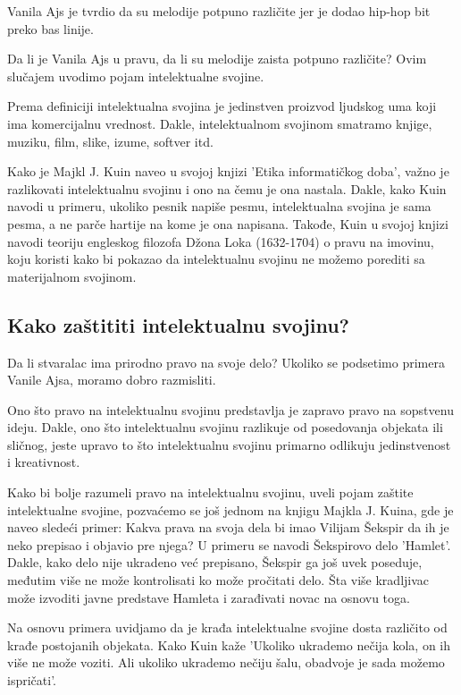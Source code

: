 \documentclass[a4paper]{article}
\begin{document}
Vanila Ajs je tvrdio da su melodije potpuno različite jer je dodao hip-hop bit preko bas linije. \cite{rollingstone}

Da li je Vanila Ajs u pravu, da li su melodije zaista potpuno različite? Ovim slučajem uvodimo pojam intelektualne svojine.

Prema definiciji intelektualna svojina je jedinstven proizvod ljudskog uma koji ima komercijalnu vrednost. \cite{texasUniv}
Dakle, intelektualnom svojinom smatramo knjige, muziku, film, slike, izume, softver itd.

Kako je Majkl J. Kuin naveo u svojoj knjizi 'Etika informatičkog doba', \cite{ethics} važno je razlikovati 
intelektualnu svojinu i ono na čemu je ona nastala. Dakle, kako Kuin navodi u primeru, ukoliko pesnik
napiše pesmu, intelektualna svojina je sama pesma, a ne parče hartije na kome je ona napisana.
Takođe, Kuin u svojoj knjizi navodi teoriju engleskog filozofa Džona Loka (1632-1704) o pravu na imovinu,
koju koristi kako bi pokazao da intelektualnu svojinu ne možemo porediti sa materijalnom svojinom.

\subsection{Kako zaštititi intelektualnu svojinu?}
Da li stvaralac ima prirodno pravo na svoje delo? Ukoliko se podsetimo primera Vanile Ajsa, moramo
dobro razmisliti.

Ono što pravo na intelektualnu svojinu predstavlja je zapravo pravo na sopstvenu ideju. Dakle, ono što 
intelektualnu svojinu razlikuje od posedovanja objekata ili sličnog, jeste upravo to što intelektualnu
svojinu primarno odlikuju jedinstvenost i kreativnost.

Kako bi bolje razumeli pravo na intelektualnu svojinu, uveli pojam zaštite intelektualne svojine,
pozvaćemo se još jednom na knjigu Majkla J. Kuina, \cite{ethics} gde je naveo sledeći primer: \newline 
Kakva prava na svoja dela bi imao Vilijam Šekspir da ih je neko prepisao i objavio pre njega? U primeru se navodi
Šekspirovo delo 'Hamlet'. Dakle, kako delo nije ukradeno već prepisano, Šekspir ga još uvek poseduje, međutim
više ne može kontrolisati ko može pročitati delo. Šta više  kradljivac može izvoditi javne predstave
Hamleta i zarađivati novac na osnovu toga.

Na osnovu primera uvidjamo da je krađa intelektualne svojine dosta različito od krađe postojanih objekata.
Kako Kuin kaže 'Ukoliko ukrademo nečija kola, on ih više ne može voziti. Ali ukoliko ukrademo nečiju šalu, 
obadvoje je sada možemo ispričati'.
\end{document}
